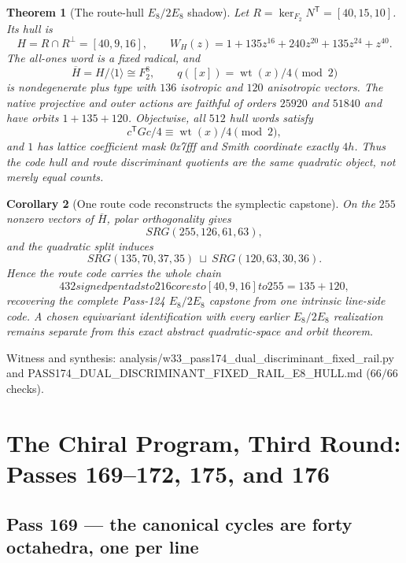 \documentclass[12pt,a4paper]{article}
\def\mathbb#1{#1}%
\def\mathrm#1{#1}%
\def\mathbf#1{#1}%
\def\texttt#1{#1}%
\def\text#1{#1}%
\def\to{ to }%
\newtheorem{theorem}{Theorem}[section]
\newtheorem{corollary}[theorem]{Corollary}
\theoremstyle{definition}
\newcommand{\SRG}{\mathrm{SRG}}
\begin{document}
\begin{theorem}[The route-hull $E_8/2E_8$ shadow]
\label{thm:pass174-route-hull}
Let $R=\ker_{\mathbb F_2}N^{\mathsf T}=[40,15,10]$.  Its hull is
\[
 H=R\cap R^{\perp}=[40,9,16],
 \qquad
 W_H(z)=1+135z^{16}+240z^{20}+135z^{24}+z^{40}.
\]
The all-ones word is a fixed radical, and
\[
 \overline H=H/\langle\mathbf1\rangle\cong\mathbb F_2^8,
 \qquad q([x])=\operatorname{wt}(x)/4\pmod2
\]
is nondegenerate plus type with $136$ isotropic and $120$ anisotropic
vectors.  The native projective and outer actions are faithful of orders
$25920$ and $51840$ and have orbits $1+135+120$.  Objectwise, all $512$
hull words satisfy
\[
 c^{\mathsf T}Gc/4\equiv\operatorname{wt}(x)/4\pmod2,
\]
and $\mathbf1$ has lattice coefficient mask \texttt{0x7fff} and Smith
coordinate exactly $4h$.  Thus the code hull and route discriminant
quotients are the same quadratic object, not merely equal counts.
\end{theorem}

\begin{corollary}[One route code reconstructs the symplectic capstone]
On the $255$ nonzero vectors of $\overline H$, polar orthogonality gives
\[
 \SRG(255,126,61,63),
\]
and the quadratic split induces
\[
 \SRG(135,70,37,35)\ \sqcup\ \SRG(120,63,30,36).
\]
Hence the route code carries the whole chain
\[
 432\text{ signed pentads}\to216\text{ cores}\to
 [40,9,16]\to255=135+120,
\]
recovering the complete Pass-124 $E_8/2E_8$ capstone from one intrinsic
line-side code.  A chosen equivariant identification with every earlier
$E_8/2E_8$ realization remains separate from this exact abstract
quadratic-space and orbit theorem.
\end{corollary}

\noindent Witness and synthesis:
\texttt{analysis/w33\_pass174\_dual\_discriminant\_fixed\_rail.py}
and \texttt{PASS174\_DUAL\_DISCRIMINANT\_FIXED\_RAIL\_E8\_HULL.md}
($66/66$ checks).

\section{The Chiral Program, Third Round: Passes 169--172, 175, and 176}
\label{sec:chiral-program-three}

\subsection{Pass 169 --- the canonical cycles are forty octahedra, one per
line}
\label{ssec:pass169}
\end{document}
